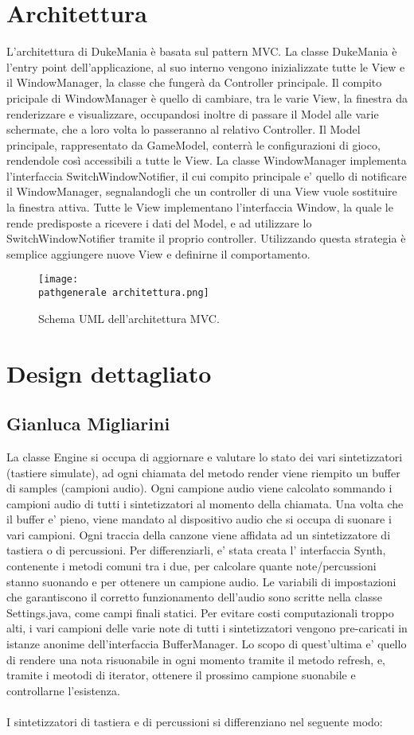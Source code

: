 \documentclass[a4paper,12pt]{report}
\newcommand\pathgenerale{img/generali/}
\begin{document}
\section{Architettura}
L'architettura di DukeMania è basata sul pattern MVC.
La classe DukeMania è l'entry point dell'applicazione, al suo interno vengono inizializzate tutte le View e il WindowManager, la classe che fungerà da Controller principale.
Il compito pricipale di WindowManager è quello di cambiare, tra le varie View, la finestra da renderizzare e visualizzare, occupandosi inoltre di passare il Model alle varie schermate, che a loro volta lo passeranno al relativo Controller.
Il Model principale, rappresentato da GameModel, conterrà le configurazioni di gioco, rendendole così accessibili a tutte le View.
La classe WindowManager implementa l'interfaccia SwitchWindowNotifier, il cui compito principale e' quello di notificare il WindowManager, segnalandogli che un controller di una View vuole sostituire la finestra attiva.
Tutte le View implementano l'interfaccia Window, la quale le rende predisposte a ricevere i dati del Model, e ad utilizzare lo SwitchWindowNotifier tramite il proprio controller.
Utilizzando questa strategia è semplice aggiungere nuove View e definirne il comportamento.
\begin{figure}[!htb]
	\centerline{\texttt{[image: \\pathgenerale architettura.png]}}
	\caption{Schema UML dell'architettura MVC.}
	\label{img:architecture}
\end{figure}
\clearpage


\section{Design dettagliato}
\subsection{Gianluca Migliarini}
La classe Engine si occupa di aggiornare e valutare lo stato dei vari sintetizzatori (tastiere simulate), ad ogni chiamata del metodo render viene riempito un buffer di samples (campioni audio). Ogni campione audio viene calcolato sommando i campioni audio di tutti i sintetizzatori al momento della chiamata.
Una volta che il buffer e' pieno, viene mandato al dispositivo audio che si occupa di suonare i vari campioni.
Ogni traccia della canzone viene affidata ad un sintetizzatore di tastiera o di percussioni. Per differenziarli, e' stata creata l' interfaccia Synth, contenente i metodi comuni tra i due, per calcolare quante note/percussioni stanno suonando e per ottenere un campione audio.
Le variabili di impostazioni che garantiscono il corretto funzionamento dell'audio sono scritte nella classe Settings.java, come campi finali statici.
Per evitare costi computazionali troppo alti, i vari campioni delle varie note di tutti i sintetizzatori vengono pre-caricati in istanze anonime dell'interfaccia BufferManager. Lo scopo di quest'ultima e' quello di rendere una nota risuonabile in ogni momento tramite il metodo refresh, e, tramite i meotodi di iterator, ottenere il prossimo campione suonabile e controllarne l'esistenza. \\ \\
I sintetizzatori di tastiera e di percussioni si differenziano nel seguente modo:
\newpage
\end{document}
